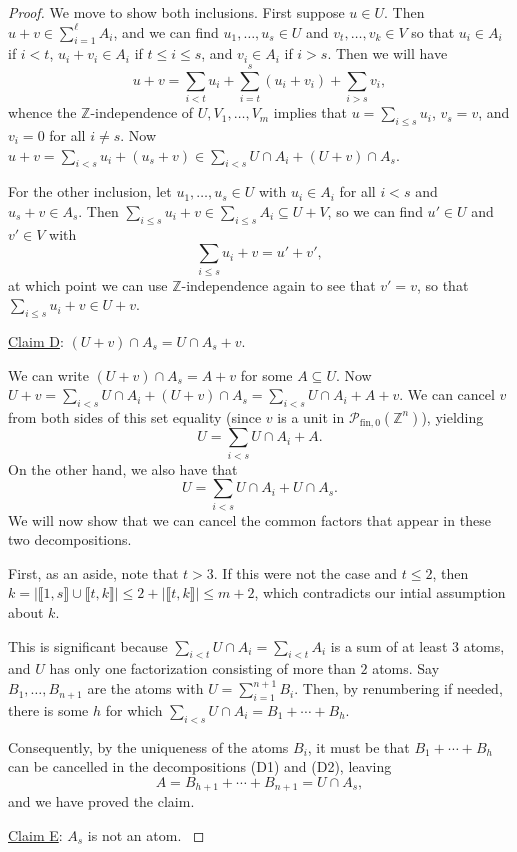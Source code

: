 \documentclass{report}
\renewcommand{\P}{\mathcal{P}}
\newcommand{\ZZ}{\mathbb{Z}}
\newcommand{\llb}{\llbracket}
\newcommand{\rrb}{\rrbracket}
\newcommand{\fon}{{\textrm{fin}, 0}}
\renewcommand{\:}{\text{:}}
\theoremstyle{definition}
\begin{document}
\begin{proof}
We move to show both inclusions.
First suppose $u\in U$. 
Then $u+v \in \sum_{i=1}^\ell A_i$, and we can find $u_1,\dots, u_s\in U$ and $v_t,\dots, v_k\in V$ so that
$u_i\in A_i$ if $i < t$, $u_i + v_i \in A_i$ if $t\le i \le s$, and $v_i \in A_i$ if $i > s$.
Then we will have
\[u+v = \sum_{i<t} u_i + \sum_{i=t}^{s} (u_i+v_i) + \sum_{i > s} v_i, \]
whence the $\ZZ$-independence of $U,V_1,\dots,V_m$ implies that $u = \sum_{i\le s} u_i$, $v_s = v$, and $v_i = 0$ for all $i\neq s$.
Now $u+v = \sum_{i<s} u_i + (u_s+v)\in \sum_{i<s} U\cap A_i + (U+v)\cap A_s$.

For the other inclusion, let $u_1,\dots, u_s\in U$ with $u_i\in A_i$ for all $i<s$ and $u_s + v\in A_s$.
Then $\sum_{i\le s} u_i +v \in \sum_{i\le s} A_i \subseteq U+V$, so we can find $u'\in U$ and $v'\in V$ with 
\[\sum_{i\le s}u_i + v = u' + v',\]
at which point we can use $\ZZ$-independence again to see that $v' = v$, so that $\sum_{i\le s} u_i + v\in U+v$.

\noindent\underline{Claim D}: $(U+v)\cap A_s = U\cap A_s + v$. \label{cld}

We can write $(U+v)\cap A_s = A + v$ for some $A \subseteq U$.
Now $U+v = \sum_{i<s} U\cap A_i + (U+v)\cap A_s = \sum_{i<s} U\cap A_i + A + v$.
We can cancel $v$ from both sides of this set equality (since $v$ is a unit in $\P_\fon(\ZZ^n)$), yielding
\[ U = \sum_{i<s} U\cap A_i + A. \tag{D1}\]
On the other hand, we also have that
\[ U = \sum_{i<s} U\cap A_i + U\cap A_s. \tag{D2}\]
We will now show that we can cancel the common factors that appear in these two decompositions.

First, as an aside, note that $t > 3$.
If this were not the case and $t \le 2$, then $k = | \llb 1,s \rrb \cup \llb t,k \rrb | \le 2 + | \llb t,k \rrb | \le m+2$, which contradicts our intial assumption about $k$.

This is significant because $\sum_{i<t} U\cap A_i = \sum_{i<t} A_i$ is a sum of at least 3 atoms, and $U$ has only one factorization consisting of more than $2$ atoms.
Say $B_1,\dots, B_{n+1}$ are the atoms with $U = \sum_{i=1}^{n+1} B_i$.
Then, by renumbering if needed, there is some $h$ for which $\sum_{i<s} U\cap A_i = B_1 + \cdots + B_h$.

Consequently, by the uniqueness of the atoms $B_i$, it must be that $B_1 +\cdots + B_h$ can be cancelled in the decompositions (D1) and (D2), leaving
\[ A = B_{h+1} +\cdots+ B_{n+1} = U\cap A_s, \]
and we have proved the claim.

\noindent\underline{Claim E}: $A_s$ is not an atom. \label{cle}


\end{proof}
\end{document}

